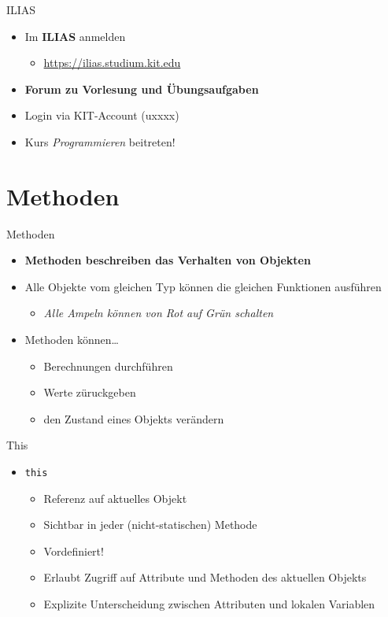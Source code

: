 \documentclass[18pt]{beamer}
\begin{document}
\begin{frame}{ILIAS}
    \begin{itemize}
        \item Im \textbf{ILIAS} anmelden
        \begin{itemize}
            \item \url{https://ilias.studium.kit.edu}
        \end{itemize}
        \item \textbf{Forum zu Vorlesung und Übungsaufgaben}
        \item Login via KIT-Account (uxxxx)
        \item \alert{Kurs \textit{Programmieren} beitreten!}
    \end{itemize}
\end{frame}



\section{Methoden}

\begin{frame}{Methoden}
    \begin{itemize}
        \item \textbf{Methoden beschreiben das Verhalten von Objekten}
        \pause
        \item Alle Objekte vom gleichen Typ können die gleichen Funktionen ausführen
        \begin{itemize}
            \item \textit{Alle Ampeln können von Rot auf Grün schalten}
        \end{itemize}
        \pause
        \vspace{.2in}
        \item Methoden können\dots
        \begin{itemize}
            \item Berechnungen durchführen
            \item Werte züruckgeben
            \item den Zustand eines Objekts verändern
        \end{itemize}
    \end{itemize}
\end{frame}

\begin{frame}{This}
    \begin{itemize}
        \item \texttt{this}
        \begin{itemize}
            \item Referenz auf aktuelles Objekt
            \item Sichtbar in jeder (nicht-statischen) Methode
            \item Vordefiniert!
            \item Erlaubt Zugriff auf Attribute und Methoden des aktuellen Objekts
            \item Explizite Unterscheidung zwischen Attributen und lokalen Variablen
        \end{itemize}
    \end{itemize}
\end{frame}
\end{document}
